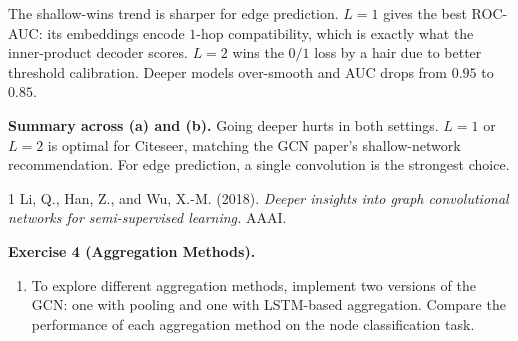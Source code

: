 \documentclass{article}
\begin{document}
\begin{tcolorbox}[colback=white, colframe=black!75, breakable, title=\textbf{Solution to Exercise 3}]
The shallow-wins trend is sharper for edge prediction. $L=1$ gives the best ROC-AUC: its embeddings encode $1$-hop compatibility, which is exactly what the inner-product decoder scores. $L=2$ wins the $0/1$ loss by a hair due to better threshold calibration. Deeper models over-smooth and AUC drops from $0.95$ to $0.85$.

\medskip
\textbf{Summary across (a) and (b).} Going deeper hurts in both settings. $L=1$ or $L=2$ is optimal for Citeseer, matching the GCN paper's shallow-network recommendation. For edge prediction, a single convolution is the strongest choice.

\begin{thebibliography}{1}
 Li, Q., Han, Z., and Wu, X.-M. (2018). \emph{Deeper insights into graph convolutional networks for semi-supervised learning.} AAAI.
\end{thebibliography}
\end{tcolorbox}

\vspace{8pt}

\begin{tcolorbox}[colback = gray!16, enhanced, boxrule=0pt, frame hidden, sharp corners, borderline west={3pt}{-1.5pt}{black!80},breakable]
\textbf{Exercise 4 (Aggregation Methods).}
\begin{enumerate}[$(a)$]
    \item To explore different aggregation methods, implement two versions of the GCN: one with pooling and one with LSTM-based aggregation. Compare the performance of each aggregation method on the node classification task.
\end{enumerate}
\end{tcolorbox}
\end{document}
